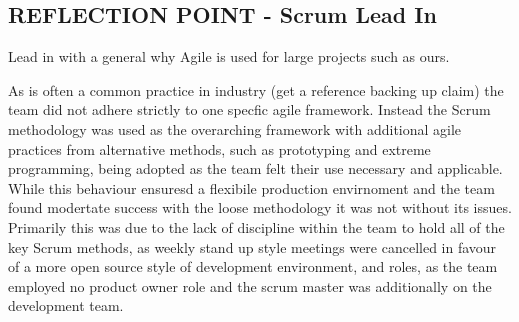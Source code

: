 \documentclass{l3proj}
\begin{document}
\subsection{REFLECTION POINT - Scrum Lead In}
\label{sec:teamstructure}


%
%
%



Lead in with a general why Agile is used for large projects such as ours.

As is often a common practice in industry (get a reference backing up claim) the team did not adhere strictly to one specfic agile framework. Instead the Scrum methodology was used as the overarching framework with additional agile practices from alternative methods, such as prototyping and extreme programming, being adopted as the team felt their use necessary and applicable. While this behaviour ensuresd a flexibile production envirnoment and the team found modertate success with the loose methodology it was not without its issues. Primarily this was due to the lack of discipline within the team to hold all of the key Scrum methods, as weekly stand up style meetings were cancelled in favour of a more open source style of development environment, and roles, as the team employed no product owner role and the scrum master was additionally on the development team. 
\end{document}

